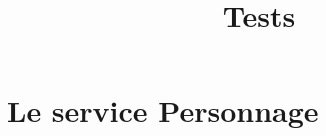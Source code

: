 \documentclass[a4paper, 11pt, notitlepage]{report}
\title{
  \huge Tests \\
}
\author{
  }
\date{}
\begin{document}
\maketitle


\section{Le service Personnage}
\end{document}
